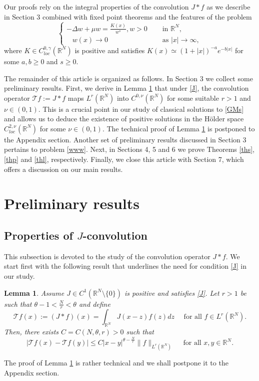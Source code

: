 \documentclass[leqno,12pt]{article}
\newcommand{\R}{\mathbb R}
\newtheorem{lemma}[theorem]{Lemma}
\numberwithin{equation}{section}
\begin{document}
Our proofs rely on the integral properties of the convolution $J*f$ as we describe in Section 3 combined with fixed point theorems and the features of the problem
\begin{equation}\label{www}
\begin{cases}
-\Delta w+\mu w=\frac{K(x)}{ w^{s}}, w>0 &\quad\mbox{ in }\R^N,\\
\;\;\; w(x)\to 0& \quad\mbox{ as }|x|\to \infty,
\end{cases}
\end{equation}
where $K\in C^{0, \gamma}_{loc}(\R^N)$ is positive and satisfies $K(x)\simeq (1+|x|)^{-a} e^{-b|x|}$ for some $a, b\geq 0$ and $s\geq 0.$ 




The remainder of this article is organized as follows. In Section 3 we collect some preliminary results.
First, we derive in Lemma \ref{l2} that under \eqref{J}, the convolution operator $\mathcal{T}f:=J*f$ maps $L^r(\R^N)$ into $C^{0, \nu}(\R^N)$ for some suitable $r>1$ and $\nu\in (0,1)$. This is a crucial point in our study of classical solutions to \eqref{GMs} and allows us to deduce the existence of positive solutions in the H\"older space $C^{2, \nu}_{loc}(\R^N)$ for some $\nu\in (0,1)$. The technical proof of Lemma \ref{l2} is postponed to the Appendix section. Another set of preliminary results discussed in Section 3 pertains to problem \eqref{www}. Next, in Sections 4, 5 and 6 we prove Theorems \ref{ths}, \ref{thp}  and \ref{thl}, respectively. Finally, we close this article with Section 7, which offers a discussion on our main results.



\section{Preliminary results}

\subsection{Properties of $J$-convolution}

This subsection is devoted to the study of the convolution operator  $J*f$. We start first with the following result that underlines the need for condition \eqref{J} in our study.  

\begin{lemma}\label{l2}
Assume $J\in C^1(\R^N\setminus\{0\})$ is positive and satisfies \eqref{J}.  Let $r> 1$ be such that $\theta-1<\frac{N}{r}<\theta$ and define
$$
\mathcal{T}f(x):=(J*f)(x)=\int_{\R^N} J(x-z)f(z) dz \quad \mbox{ for all }f\in L^r(\R^N). 
$$
Then, there exists $C=C(N, \theta, r)>0$ such that 
\begin{equation}\label{hol}
|\mathcal{T}f(x)-\mathcal{T}f(y)|\leq C|x-y|^{\theta-\frac{N}{r}}\|f\|_{L^r(\R^N)}\quad\mbox{ for all }x, y\in\R^N.
\end{equation}
\end{lemma}
The proof of Lemma \ref{l2} is rather technical and we shall postpone it to the Appendix section. 
\end{document}

